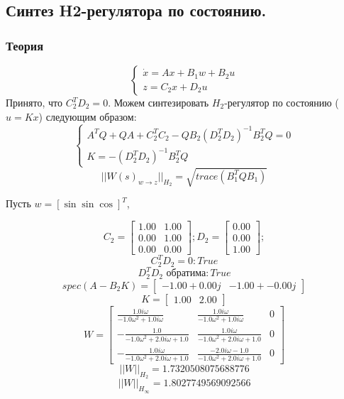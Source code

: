 \subsection{Синтез H2-регулятора по состоянию.}
\subsubsection{Теория}
\[
        \begin{cases}
                \dot{x} = A x + B_1 w + B_2 u \\
                z = C_2x + D_2 u  
        \end{cases}
\]
Принято, что \(C_2^T D_2 = 0\).
Можем синтезировать $H_2$-регулятор по состоянию ($u=Kx$) следующим образом:
\[
    \begin{cases}
        A^TQ + QA + C_2^TC_2 - QB_2(D_2^TD_2)^{-1}B_2^TQ=0 \\
        K = -(D_2^TD_2)^{-1}B_2^TQ
    \end{cases}
\]
\[||W(s)_{w \rightarrow z}||_{H_2} = \sqrt{trace(B_1^T Q B_1)}\]

Пусть \(w = [\sin \sin \cos]^T\), 

\[C_2 = \begin{bmatrix}
  1.00 &  1.00\\
  0.00 &  1.00\\
  0.00 &  0.00
\end{bmatrix}; D_2 = \begin{bmatrix}
  0.00\\
  0.00\\
  1.00
\end{bmatrix};\]
\[C_2^T D_2 = 0: True\]
\[D_2^T D_2 \text{ обратима}: True\]
\[spec(A-B_2 K) = \begin{bmatrix}
 -1.00 + 0.00j & -1.00 + -0.00j
\end{bmatrix}\]
\[K = \begin{bmatrix}
  1.00 &  2.00
\end{bmatrix}\]
\[ W = \left[\begin{matrix}\frac{1.0 i \omega}{- 1.0 \omega^{2} + 1.0 i \omega} & \frac{1.0 i \omega}{- 1.0 \omega^{2} + 1.0 i \omega} & 0\\- \frac{1.0}{- 1.0 \omega^{2} + 2.0 i \omega + 1.0} & \frac{1.0 i \omega}{- 1.0 \omega^{2} + 2.0 i \omega + 1.0} & 0\\- \frac{1.0 i \omega}{- 1.0 \omega^{2} + 2.0 i \omega + 1.0} & \frac{- 2.0 i \omega - 1.0}{- 1.0 \omega^{2} + 2.0 i \omega + 1.0} & 0\end{matrix}\right]\]
\[||W||_{H_2} = 1.7320508075688776\]
\[||W||_{H_\infty} = 1.8027749569092566 \]

